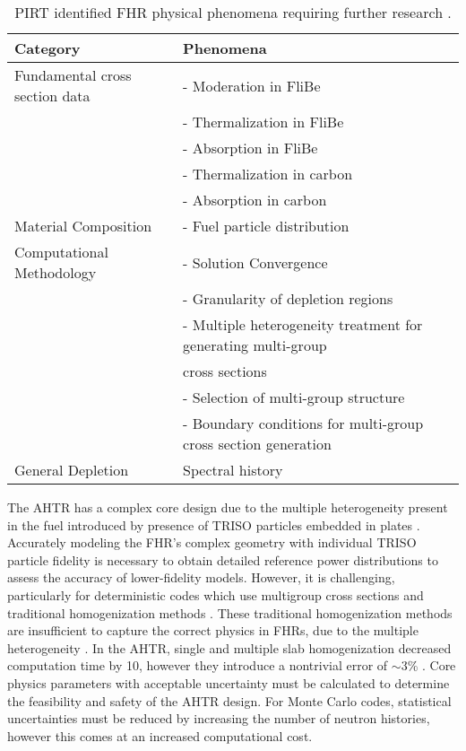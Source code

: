 \begin{table}[]
    \centering
    \onehalfspacing
    \caption{\gls{PIRT} identified \gls{FHR} physical phenomena requiring further research 
    \cite{rahnema_phenomena_2019}.}
	\label{tab:phenomena}
    \small
    \begin{tabular}{l|l}
    \hline
    \textbf{Category} & \textbf{Phenomena} \\ \hline
    Fundamental cross section data & - Moderation in FliBe \\
    & - Thermalization in FliBe \\
    & - Absorption in FliBe \\
    & - Thermalization in carbon \\
    & - Absorption in carbon \\ \hline
    Material Composition & - Fuel particle distribution \\ \hline
    Computational Methodology & - Solution Convergence \\ 
    & - Granularity of depletion regions \\
    & - Multiple heterogeneity treatment for generating multi-group \\ 
    & cross sections \\
    & - Selection of multi-group structure \\
    & - Boundary conditions for multi-group cross section generation \\ \hline 
    General Depletion & Spectral history \\ \hline 
    \end{tabular}
    \end{table}

The \gls{AHTR} has a complex core design due to the multiple heterogeneity present 
in the fuel introduced by presence of \gls{TRISO} particles embedded in plates 
\cite{ramey_monte_2018,rahnema_phenomena_2019}.
Accurately modeling the \gls{FHR}'s complex geometry with individual \gls{TRISO}
particle fidelity is necessary to obtain detailed reference power distributions 
to assess the accuracy of lower-fidelity models.
However, it is challenging, particularly for deterministic codes which 
use multigroup cross sections and traditional homogenization methods
\cite{ramey_monte_2018}. 
These traditional homogenization methods are insufficient to capture the correct physics 
in \glspl{FHR}, due to the multiple heterogeneity \cite{ramey_monte_2018}. 
In the \gls{AHTR}, single and multiple slab homogenization decreased computation time 
by 10, however they introduce a nontrivial error of $\sim$3\%
\cite{ramey_monte_2018,cisneros_neutronics_2012}.
Core physics parameters with acceptable uncertainty must be calculated to determine 
the feasibility and safety of the \gls{AHTR} design.
For Monte Carlo codes, statistical uncertainties must be reduced by increasing 
the number of neutron histories, however this comes at an increased 
computational cost.

